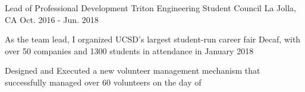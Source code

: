 

\begin{cventries}

  \cventry
    {Lead of Professional Development} %
    {Triton Engineering Student Council} %
    {La Jolla, CA} %
    {Oct. 2016 - Jun. 2018} %
    {
      \begin{cvitems} %
        \item {As the team lead, I organized UCSD's largest student-run career fair Decaf, with over 50 companies and 1300 students in attendance in January 2018}
        \item {Designed and Executed a new volunteer management mechanism that successfully managed over 60 volunteers on the day of}
      \end{cvitems}
    }


\end{cventries}
